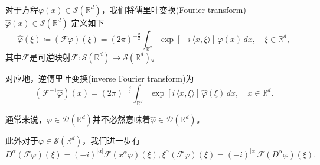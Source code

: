 \begin{definition}[傅里叶变换]
  \label{definition:fourier-transformation}
  对于方程$\varphi(x) \in \mathcal{S}(\mathbb{R}^d)$，我们将傅里叶变换(Fourier transform) $\widehat{\varphi}(x) \in \mathcal{S}(\mathbb{R}^d)$ 定义如下
  \begin{equation}
    \label{eq:sobo-distri-fourier-transform-def}
    \widehat{\varphi}(\xi) \coloneqq \left( \mathcal{F} \varphi \right)(\xi) =
    \left( 2 \pi \right)^{-\frac{d}{2}} \int_{\mathbb{R}^d}
    \exp \left[ - i \, \langle x, \xi \rangle \right] \,
    \varphi(x) \, dx, \quad \xi \in \mathbb{R}^d,
  \end{equation}
  其中$\mathcal{F}$是可逆映射$\mathcal{F}:\mathcal{S}(\mathbb{R}^d) \mapsto \mathcal{S}(\mathbb{R}^d)$。

  对应地，逆傅里叶变换(inverse Fourier transform)为
  \begin{equation}
    \label{eq:sobo-distri-inverse-fourier-transform-def}
    \left( \mathcal{F}^{-1} \widehat{\varphi} \right)(x) =
    \left( 2 \pi \right)^{-\frac{d}{2}} \int_{\mathbb{R}^d}
    \exp \left[ i \, \langle x, \xi \rangle \right] \,
    \widehat{\varphi}(\xi) \, dx, \quad x \in \mathbb{R}^d.
  \end{equation}

通常来说，$\varphi \in \mathcal{D}(\mathbb{R}^d)$并不必然意味着$\widehat{\varphi} \in \mathcal{D}(\mathbb{R}^d)$。

此外对于$\varphi \in \mathcal{S}(\mathbb{R}^d)$，我们进一步有
\begin{subequations}
  \begin{equation}
  \label{eq:sobolev-distribution-fourier-higher-order-f}
  D^{\alpha} \left( \mathcal{F} \varphi \right)(\xi) = (-i)^{\left| \alpha \right|} \mathcal{F}\left( x^{\alpha} \varphi \right) (\xi),
\end{equation}
\begin{equation}
  \label{eq:sobolev-distribution-fourier-higher-order-xi}
  \xi^{\alpha} \left( \mathcal{F} \varphi \right)(\xi) = (-i)^{\left| \alpha \right|} \mathcal{F} \left( D^{\alpha} \varphi \right) (\xi).
\end{equation}
\end{subequations}
\end{definition}

